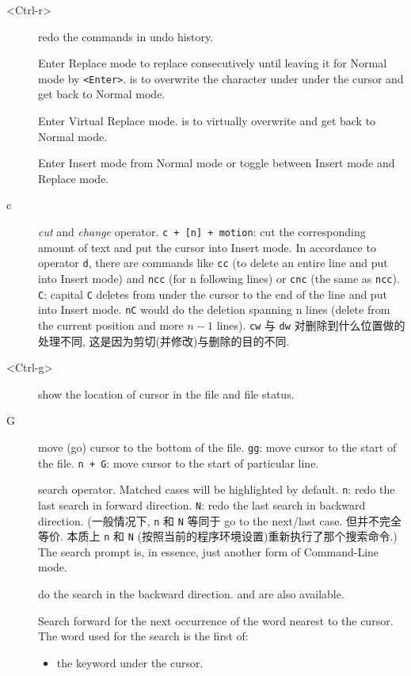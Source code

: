 \documentclass{article}
\newcommand{\syntax}[1]{\PVerb{#1}}
\begin{document}
\begin{description}
\item[<Ctrl-r>] redo the commands in undo history.
\item[\syntax{R}] Enter Replace mode to replace consecutively until leaving it for Normal mode by \texttt{<Enter>}. \syntax{r{char}} is to overwrite the character under under the cursor and get back to Normal mode.
\item[\syntax{gR}] Enter Virtual Replace mode. \syntax{gr{char}} is to virtually overwrite and get back to Normal mode.
\item[\syntax{<Insert>}] Enter Insert mode from Normal mode or toggle between Insert mode and Replace mode.
\item[c] \emph{cut} and \emph{change} operator. \texttt{c + [n] + motion}: cut the corresponding amount of text and put the cursor into Insert mode. In accordance to operator \verb|d|, there are commands like \texttt{cc} (to delete an entire line and put into Insert mode) and \texttt{ncc} (for n following lines) or \texttt{cnc} (the same as \verb|ncc|). \texttt{C}: capital \verb|C| deletes from under the cursor to the end of the line and put into Insert mode. \verb|nC| would do the deletion spanning n lines (delete from the current position and more $n-1$ lines).
\texttt{cw} 与 \texttt{dw} 对删除到什么位置做的处理不同, 这是因为剪切(并修改)与删除的目的不同.
\item[<Ctrl-g>] show the location of cursor in the file and file status.
\item[G] move (go) cursor to the bottom of the file. \texttt{gg}: move cursor to the start of the file. \texttt{n + G}: move cursor to the start of particular line.
\item[\syntax{/{char}}] search operator. Matched cases will be highlighted by default. \texttt{n}: redo the last search in forward direction. \texttt{N}: redo the last search in backward direction. 
(一般情况下, \texttt{n} 和 \texttt{N} 等同于 go to the next/last case. 但并不完全等价. 本质上 \texttt{n} 和 \texttt{N} (按照当前的程序环境设置)重新执行了那个搜索命令.) The search prompt is, in essence, just another form of Command-Line mode.
\item[\syntax{?}] do the search in the backward direction. \syntax{n} and \syntax{N} are also available.
\item[\syntax{*}] Search forward for the next occurrence of the word nearest to the cursor. The word used for the search is the first of:
\begin{itemize}
  \item the keyword under the cursor.

\end{itemize}
\end{description}
\end{document}
